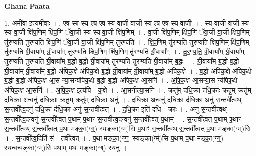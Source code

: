 \documentclass[17pt]{extarticle}
\begin{document}
\textbf{Ghana Paata } \newline

1. अमी॑वा॒ इत्यमी॑वाः । . ए॒ष स्य स्य ए॒ष ए॒ष स्य वा॒जी वा॒जी स्य ए॒ष ए॒ष स्य वा॒जी । . स्य वा॒जी वा॒जी स्य स्य वा॒जी क्षि॑प॒णिम् क्षि॑प॒णिं ॅवा॒जी स्य स्य वा॒जी क्षि॑प॒णिम् । . वा॒जी क्षि॑प॒णिम् क्षि॑प॒णिं ॅवा॒जी वा॒जी क्षि॑प॒णिम् तु॑रण्यति तुरण्यति क्षिप॒णिं ॅवा॒जी वा॒जी क्षि॑प॒णिम् तु॑रण्यति । . क्षि॒प॒णिम् तु॑रण्यति तुरण्यति क्षिप॒णिम् क्षि॑प॒णिम् तु॑रण्यति ग्री॒वाया᳚म् ग्री॒वाया᳚म् तुरण्यति क्षिप॒णिम् क्षि॑प॒णिम् तु॑रण्यति ग्री॒वाया᳚म् । . तु॒र॒ण्य॒ति॒ ग्री॒वाया᳚म् ग्री॒वाया᳚म् तुरण्यति तुरण्यति ग्री॒वाया᳚म् ब॒द्धो ब॒द्धो ग्री॒वाया᳚म् तुरण्यति तुरण्यति ग्री॒वाया᳚म् ब॒द्धः । . ग्री॒वाया᳚म् ब॒द्धो ब॒द्धो ग्री॒वाया᳚म् ग्री॒वाया᳚म् ब॒द्धो अ॑पिक॒क्षे अ॑पिक॒क्षे ब॒द्धो ग्री॒वाया᳚म् ग्री॒वाया᳚म् ब॒द्धो अ॑पिक॒क्षे । . ब॒द्धो अ॑पिक॒क्षे अ॑पिक॒क्षे ब॒द्धो ब॒द्धो अ॑पिक॒क्ष आ॒स न्या॒सन्य॑पिक॒क्षे ब॒द्धो ब॒द्धो अ॑पिक॒क्ष आ॒सनि॑ । . अ॒पि॒क॒क्ष आ॒सन्या॒स न्य॑पिक॒क्षे अ॑पिक॒क्ष आ॒सनि॑ । . अ॒पि॒क॒क्ष इत्य॑पि - क॒क्षे । . आ॒सनीत्या॒सनि॑ । . क्रतु॑म् दधि॒क्रा द॑धि॒क्राः क्रतु॒म् क्रतु॑म् दधि॒क्रा अन्वनु॑ दधि॒क्राः क्रतु॒म् क्रतु॑म् दधि॒क्रा अनु॑ । . द॒धि॒क्रा अन्वनु॑ दधि॒क्रा द॑धि॒क्रा अनु॑ स॒न्तवी᳚त्वथ् स॒न्तवी᳚त्व॒दनु॑ दधि॒क्रा द॑धि॒क्रा अनु॑ स॒न्तवी᳚त्वत् । . द॒धि॒क्रा इति॑ दधि - क्राः । . अनु॑ स॒न्तवी᳚त्वथ् स॒न्तवी᳚त्व॒दन्वनु॑ स॒न्तवी᳚त्वत् प॒थाम् प॒थाꣳ स॒न्तवी᳚त्व॒दन्वनु॑ स॒न्तवी᳚त्वत् प॒थाम् । . स॒न्तवी᳚त्वत् प॒थाम् प॒थाꣳ स॒न्तवी᳚त्वथ् स॒न्तवी᳚त्वत् प॒था मङ्का॒(ग्ग्॒) स्यङ्का(ग्म्॑)सि प॒थाꣳ स॒न्तवी᳚त्वथ् स॒न्तवी᳚त्वत् प॒था मङ्का(ग्म्॑)सि । . स॒न्तवी᳚त्व॒दिति॑ सं - तवी᳚त्वत् । . प॒था मङ्का॒(ग्ग्॒) स्यङ्का(ग्म्॑)सि प॒थाम् प॒था मङ्का॒(ग्ग्॒) स्यन्वन्वङ्का(ग्म्॑)सि प॒थाम् प॒था मङ्का॒(ग्ग्॒) स्यनु॑ । \newline
\end{document}

